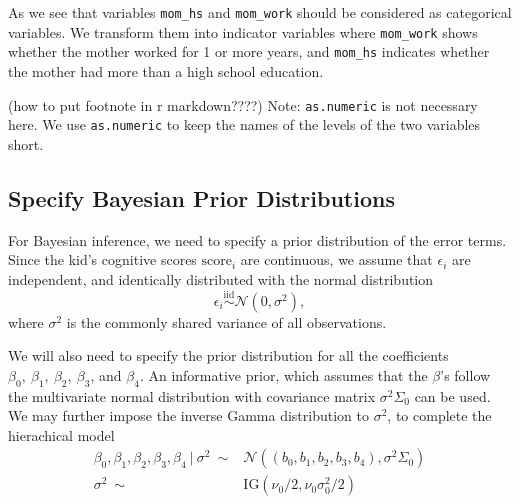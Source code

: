 \documentclass[]{book}
\newenvironment{Shaded}{\begin{snugshade}}{\end{snugshade}}
\newcommand{\KeywordTok}[1]{\textcolor[rgb]{0.13,0.29,0.53}{\textbf{#1}}}
\newcommand{\DecValTok}[1]{\textcolor[rgb]{0.00,0.00,0.81}{#1}}
\newcommand{\StringTok}[1]{\textcolor[rgb]{0.31,0.60,0.02}{#1}}
\newcommand{\CommentTok}[1]{\textcolor[rgb]{0.56,0.35,0.01}{\textit{#1}}}
\newcommand{\OperatorTok}[1]{\textcolor[rgb]{0.81,0.36,0.00}{\textbf{#1}}}
\newcommand{\NormalTok}[1]{#1}
\theoremstyle{definition}
\theoremstyle{definition}
\theoremstyle{definition}
\theoremstyle{remark}
\begin{document}
As we see that variables \texttt{mom\_hs} and \texttt{mom\_work} should
be considered as categorical variables. We transform them into indicator
variables where \texttt{mom\_work} shows whether the mother worked for 1
or more years, and \texttt{mom\_hs} indicates whether the mother had
more than a high school education.

\begin{Shaded}
\end{Shaded}

(how to put footnote in r markdown????) Note: \texttt{as.numeric} is not
necessary here. We use \texttt{as.numeric} to keep the names of the
levels of the two variables short.

\subsection{Specify Bayesian Prior
Distributions}\label{specify-bayesian-prior-distributions}

For Bayesian inference, we need to specify a prior distribution of the
error terms. Since the kid's cognitive scores \(\text{score}_i\) are
continuous, we assume that \(\epsilon_i\) are independent, and
identically distributed with the normal distribution
\[ \epsilon_i \overset{\text{iid}}{\sim} \mathcal{N}(0, \sigma^2), \]
where \(\sigma^2\) is the commonly shared variance of all observations.

We will also need to specify the prior distribution for all the
coefficients \(\beta_0,\ \beta_1,\ \beta_2,\ \beta_3\), and \(\beta_4\).
An informative prior, which assumes that the \(\beta\)'s follow the
multivariate normal distribution with covariance matrix
\(\sigma^2\Sigma_0\) can be used. We may further impose the inverse
Gamma distribution to \(\sigma^2\), to complete the hierachical model
\[ 
\begin{aligned}
\beta_0, \beta_1, \beta_2, \beta_3, \beta_4 ~|~\sigma^2 \ \sim & \mathcal{N}((b_0, b_1, b_2, b_3, b_4), \sigma^2\Sigma_0)\\
\sigma^2 \ \sim & \text{IG}(\nu_0/2, \nu_0\sigma_0^2/2) 
\end{aligned}
\]
\end{document}

